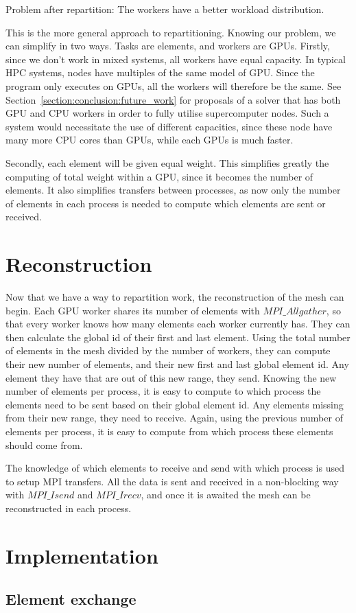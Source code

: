 \begin{table}[H]
\begin{center}
		\caption{Problem after repartition: The workers have a better workload distribution.}
		\label{table:after_repartition}
	\end{center}
\end{table}

This is the more general approach to repartitioning. Knowing our problem, we can simplify in two
ways. Tasks are elements, and workers are GPUs. Firstly, since we don't work in mixed systems, all
workers have equal capacity. In typical HPC systems, nodes have multiples of the same model of GPU.
Since the program only executes on GPUs, all the workers will therefore be the same. See
Section~\ref{section:conclusion:future_work} for proposals of a solver that has both GPU and CPU
workers in order to fully utilise supercomputer nodes. Such a system would necessitate the use of
different capacities, since these node have many more CPU cores than GPUs, while each GPUs is much
faster. 

Secondly, each element will be given equal weight. This simplifies greatly the computing of total
weight within a GPU, since it becomes the number of elements. It also simplifies transfers between
processes, as now only the number of elements in each process is needed to compute which elements
are sent or received.

\section{Reconstruction} \label{section:load_balancing:reconstruction}

Now that we have a way to repartition work, the reconstruction of the mesh can begin. Each GPU
worker shares its number of elements with $MPI\_Allgather$, so that every worker knows how many
elements each worker currently has. They can then calculate the global id of their first and last
element. Using the total number of elements in the mesh divided by the number of workers, they can
compute their new number of elements, and their new first and last global element id. Any element
they have that are out of this new range, they send. Knowing the new number of elements per process,
it is easy to compute to which process the elements need to be sent based on their global element
id. Any elements missing from their new range, they need to receive. Again, using the previous
number of elements per process, it is easy to compute from which process these elements should come
from. 

The knowledge of which elements to receive and send with which process is used to setup MPI
transfers. All the data is sent and received in a non-blocking way with $MPI\_Isend$ and
$MPI\_Irecv$, and once it is awaited the mesh can be reconstructed in each process. 

\section{Implementation} \label{section:load_balancing:implementation}
\subsection{Element exchange} \label{section:load_balancing:implementation:element_exchange}
